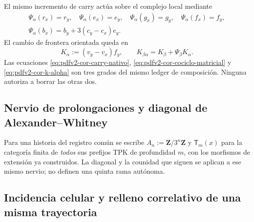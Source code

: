 El mismo incremento de carry actúa sobre el complejo local mediante
\begin{equation}
\label{eq:pdfv2-cor-psi-generadores}
 \begin{gathered}
 \Psi_\alpha(r_x)=r_y,\quad
 \Psi_\alpha(e_x)=e_y,\quad
 \Psi_\alpha(g_x)=g_y,\quad
 \Psi_\alpha(f_x)=f_y,\\
 \Psi_\alpha(b_x)=b_y+3(c_y-c_x)e_y.
 \end{gathered}
\end{equation}
El cambio de frontera orientada queda en
\begin{equation}
\label{eq:pdfv2-cor-k-alpha}
 K_\alpha:=(v_y-v_x)f_y,
 \qquad
 K_{\beta\alpha}=K_\beta+\Psi_\beta K_\alpha.
\end{equation}
Las ecuaciones \eqref{eq:pdfv2-cor-carry-nativo},
\eqref{eq:pdfv2-cor-cociclo-matricial} y
\eqref{eq:pdfv2-cor-k-alpha} son tres grados del mismo ledger de composición.
Ninguna autoriza a borrar las otras dos.

\subsection{Nervio de prolongaciones y diagonal de Alexander--Whitney}
Para una historia del registro común se escribe
\(A_n:=\mathbf Z/3^n\mathbf Z\) y \(\mathsf T_m(x)\) para la categoría
finita de \emph{todos} sus prefijos TPK de profundidad \(m\), con los
morfismos de extensión ya construidos. La diagonal y la counidad que siguen
se aplican a ese mismo nervio; no definen una quinta rama autónoma.
\begingroup
  \let\section\subsection
  
\endgroup

\section{Incidencia celular y relleno correlativo de una misma trayectoria}

